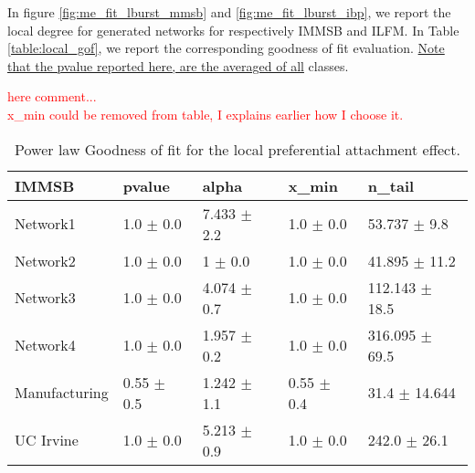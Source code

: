 \documentclass[a4paper, 12pt]{article}
\begin{document}
In figure \ref{fig:me_fit_lburst_mmsb} and \ref{fig:me_fit_lburst_ibp}, we report the local degree for generated networks for respectively IMMSB and ILFM. In Table \ref{table:local_gof}, we report the corresponding goodness of fit evaluation. \underline{Note that the pvalue reported here, are the averaged of all} classes.


\textcolor{red}{here comment...} ~\\
\textcolor{red}{x\_min could be removed from table, I explains earlier how I choose it.}





\begin{table}
    \caption{Power law Goodness of fit for the local preferential attachment effect.}
\centering
    \begin{tabular}{lllll}                                                                                    
    \hline                                                                
        \textbf{IMMSB}  & pvalue         & alpha           & x\_min          & n\_tail             \\            
    \hline                                                                                                    
    Network1     & 1.0 $\pm$ 0.0    & 7.433 $\pm$ 2.2 & 1.0 $\pm$ 0.0    & 53.737 $\pm$ 9.8   \\
    Network2     & 1.0 $\pm$ 0.0    & 1 $\pm$ 0.0    & 1.0 $\pm$ 0.0    & 41.895 $\pm$ 11.2  \\                             
    Network3     & 1.0 $\pm$ 0.0    & 4.074 $\pm$ 0.7 & 1.0 $\pm$ 0.0    & 112.143 $\pm$ 18.5 \\                
    Network4     & 1.0 $\pm$ 0.0    & 1.957 $\pm$ 0.2 & 1.0 $\pm$ 0.0    & 316.095 $\pm$ 69.5 \\
    Manufacturing & 0.55 $\pm$ 0.5 & 1.242 $\pm$ 1.1 & 0.55 $\pm$ 0.4 & 31.4 $\pm$ 14.644    \\              
    UC Irvine     & 1.0 $\pm$ 0.0    & 5.213 $\pm$ 0.9 & 1.0 $\pm$ 0.0    & 242.0 $\pm$ 26.1   \\                
    \hline                                                                
    \end{tabular}    


\end{table}
\end{document}
